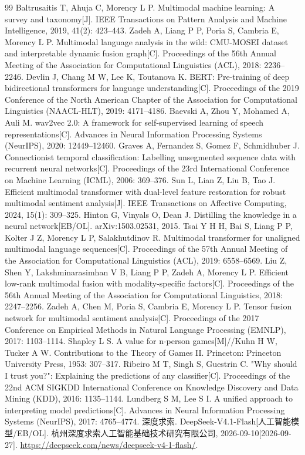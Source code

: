 \begin{thebibliography}{99}
 Baltrusaitis T, Ahuja C, Morency L P. Multimodal machine learning: A survey and taxonomy[J]. IEEE Transactions on Pattern Analysis and Machine Intelligence, 2019, 41(2): 423--443.
 Zadeh A, Liang P P, Poria S, Cambria E, Morency L P. Multimodal language analysis in the wild: CMU-MOSEI dataset and interpretable dynamic fusion graph[C]. Proceedings of the 56th Annual Meeting of the Association for Computational Linguistics (ACL), 2018: 2236--2246.
 Devlin J, Chang M W, Lee K, Toutanova K. BERT: Pre-training of deep bidirectional transformers for language understanding[C]. Proceedings of the 2019 Conference of the North American Chapter of the Association for Computational Linguistics (NAACL-HLT), 2019: 4171--4186.
 Baevski A, Zhou Y, Mohamed A, Auli M. wav2vec 2.0: A framework for self-supervised learning of speech representations[C]. Advances in Neural Information Processing Systems (NeurIPS), 2020: 12449--12460.
 Graves A, Fernandez S, Gomez F, Schmidhuber J. Connectionist temporal classification: Labelling unsegmented sequence data with recurrent neural networks[C]. Proceedings of the 23rd International Conference on Machine Learning (ICML), 2006: 369--376.
 Sun L, Lian Z, Liu B, Tao J. Efficient multimodal transformer with dual-level feature restoration for robust multimodal sentiment analysis[J]. IEEE Transactions on Affective Computing, 2024, 15(1): 309--325.
 Hinton G, Vinyals O, Dean J. Distilling the knowledge in a neural network[EB/OL]. arXiv:1503.02531, 2015.
 Tsai Y H H, Bai S, Liang P P, Kolter J Z, Morency L P, Salakhutdinov R. Multimodal transformer for unaligned multimodal language sequences[C]. Proceedings of the 57th Annual Meeting of the Association for Computational Linguistics (ACL), 2019: 6558--6569.
 Liu Z, Shen Y, Lakshminarasimhan V B, Liang P P, Zadeh A, Morency L P. Efficient low-rank multimodal fusion with modality-specific factors[C]. Proceedings of the 56th Annual Meeting of the Association for Computational Linguistics, 2018: 2247--2256.
 Zadeh A, Chen M, Poria S, Cambria E, Morency L P. Tensor fusion network for multimodal sentiment analysis[C]. Proceedings of the 2017 Conference on Empirical Methods in Natural Language Processing (EMNLP), 2017: 1103--1114.
 Shapley L S. A value for n-person games[M]//Kuhn H W, Tucker A W. Contributions to the Theory of Games II. Princeton: Princeton University Press, 1953: 307--317.
 Ribeiro M T, Singh S, Guestrin C. "Why should I trust you?": Explaining the predictions of any classifier[C]. Proceedings of the 22nd ACM SIGKDD International Conference on Knowledge Discovery and Data Mining (KDD), 2016: 1135--1144.
 Lundberg S M, Lee S I. A unified approach to interpreting model predictions[C]. Advances in Neural Information Processing Systems (NeurIPS), 2017: 4765--4774.
 深度求索. DeepSeek-V4.1-Flash[人工智能模型/EB/OL]. 杭州深度求索人工智能基础技术研究有限公司, 2026-09-10[2026-09-27]. \url{https://deepseek.com/news/deepseek-v4-1-flash/}.
\end{thebibliography}
